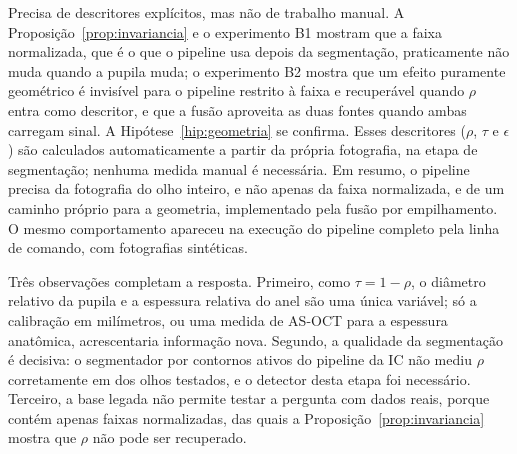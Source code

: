 
Precisa de descritores explícitos, mas não de trabalho manual. A
Proposição~\ref{prop:invariancia} e o experimento B1 mostram que a faixa
normalizada, que é o que o pipeline usa depois da segmentação, praticamente
não muda quando a pupila muda; o experimento B2 mostra que um efeito
puramente geométrico é invisível para o pipeline restrito à faixa e
recuperável quando $\rho$ entra como descritor, e que a fusão aproveita as
duas fontes quando ambas carregam sinal. A Hipótese~\ref{hip:geometria} se
confirma. Esses descritores ($\rho$, $\tau$ e $\epsilon$) são calculados
automaticamente a partir da própria fotografia, na etapa de segmentação;
nenhuma medida manual é necessária. Em resumo, o pipeline precisa da
fotografia do olho inteiro, e não apenas da faixa normalizada, e de um
caminho próprio para a geometria, implementado pela fusão por empilhamento.
O mesmo comportamento apareceu na execução do pipeline completo pela linha de
comando, com fotografias sintéticas.

Três observações completam a resposta. Primeiro, como $\tau=1-\rho$, o
diâmetro relativo da pupila e a espessura relativa do anel são uma única
variável; só a calibração em milímetros, ou uma medida de AS-OCT para a
espessura anatômica, acrescentaria informação nova. Segundo, a qualidade da
segmentação é decisiva: o segmentador por contornos ativos do pipeline da IC
não mediu $\rho$ corretamente em  dos  olhos
testados, e o detector desta etapa foi necessário. Terceiro, a base legada
não permite testar a pergunta com dados reais, porque contém apenas faixas
normalizadas, das quais a Proposição~\ref{prop:invariancia} mostra que $\rho$
não pode ser recuperado.


